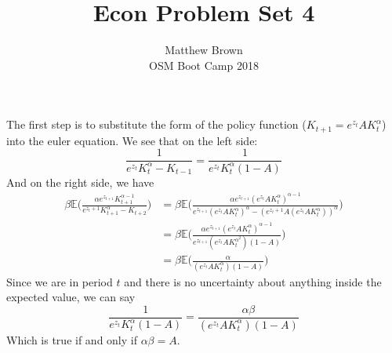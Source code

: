 \documentclass[12pt]{article}
\newenvironment{problem}[2][Problem]{\begin{trivlist}
\item[\hskip \labelsep {\bfseries #1}\hskip \labelsep {\bfseries #2.}]}{\end{trivlist}}
\theoremstyle{definition}
\theoremstyle{definition}
\theoremstyle{definition}
\theoremstyle{definition}
\begin{document}
\title{Econ Problem Set 4}
\author{Matthew Brown\\ 
OSM Boot Camp 2018} %
 
\maketitle
 
\begin{problem}{1}
The first step is to substitute the form of the policy function ($K_{t+1} = e^{z_t}AK_{t}^\alpha$) into the euler equation. We see that on the left side:
\begin{equation}
\frac{1}{e^{z_t}K_t^\alpha - K_{t-1}} = \frac{1}{e^{z_t}K_t^\alpha(1- A)}
\end{equation}
And on the right side, we have
\begin{align}
\beta \mathbb{E} \Big( \frac{\alpha e^{z_{t+1}} K_{t+1}^{\alpha - 1}}{e^{z_t+1} K_{t+1}^\alpha - K_{t+2}} \Big) &= \beta \mathbb{E} \Big( \frac{\alpha e^{z_{t+1}} (e^{z_t}AK_{t}^\alpha)^{\alpha - 1}}{e^{z_{t+1}} (e^{z_t}AK_{t}^\alpha)^\alpha - (e^{z_t+1}A(e^{z_t}AK_{t}^\alpha))^\alpha} \Big) \\ 
&= \beta \mathbb{E} \Big( \frac{\alpha e^{z_{t+1}} (e^{z_t}AK_{t}^\alpha)^{\alpha - 1}}{e^{z_{t+1}}(e^{z_t}AK_{t}^{\alpha^2})(1 - A)} \Big) \\
&=  \beta \mathbb{E} \Big( \frac{\alpha}{ (e^{z_t}AK_{t}^\alpha)(1- A)}\Big)
\end{align}
Since we are in period $t$ and there is no uncertainty about anything inside the expected value, we can say
\begin{equation}
\frac{1}{e^{z_t}K_t^\alpha(1- A)} = \frac{\alpha \beta}{ (e^{z_t}AK_{t}^\alpha)(1- A)}
\end{equation}
Which is true if and only if $\alpha \beta = A$.
\end{problem}
\end{document}
